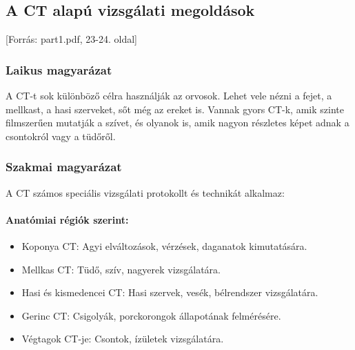 \documentclass[a4paper,12pt]{article}
\begin{document}
\subsection{A CT alapú vizsgálati megoldások} [Forrás: part1.pdf, 23-24. oldal]

\subsubsection{Laikus magyarázat} A CT-t sok különböző célra használják az orvosok. Lehet vele nézni a fejet, a mellkast, a hasi szerveket, sőt még az ereket is. Vannak gyors CT-k, amik szinte filmszerűen mutatják a szívet, és olyanok is, amik nagyon részletes képet adnak a csontokról vagy a tüdőről.

\subsubsection{Szakmai magyarázat} A CT számos speciális vizsgálati protokollt és technikát alkalmaz:

\paragraph{Anatómiai régiók szerint:} \begin{itemize} \item Koponya CT: Agyi elváltozások, vérzések, daganatok kimutatására. \item Mellkas CT: Tüdő, szív, nagyerek vizsgálatára. \item Hasi és kismedencei CT: Hasi szervek, vesék, bélrendszer vizsgálatára. \item Gerinc CT: Csigolyák, porckorongok állapotának felmérésére. \item Végtagok CT-je: Csontok, ízületek vizsgálatára. \end{itemize}
\end{document}

